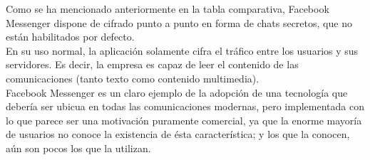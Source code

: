 Como se ha mencionado anteriormente en la tabla comparativa, Facebook Messenger dispone de cifrado punto a punto en forma de chats secretos, que no están habilitados por defecto. \\
En su uso normal, la aplicación solamente cifra el tráfico entre los usuarios y sus servidores. Es decir, la empresa es capaz de leer el contenido de las comunicaciones (tanto texto como contenido multimedia). \\

Facebook Messenger es un claro ejemplo de la adopción de una tecnología que debería ser ubicua en todas las comunicaciones modernas, pero implementada con lo que parece ser una motivación puramente comercial, ya que la enorme mayoría de usuarios no conoce la existencia de ésta característica; y los que la conocen, aún son pocos los que la utilizan. \\




